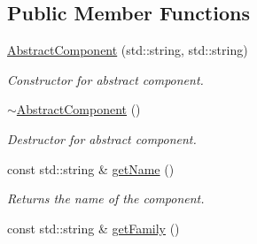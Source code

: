 \subsection*{Public Member Functions}
\begin{DoxyCompactItemize}
\item 
\hypertarget{class_abstract_component_ab08b845eddbdbe411b95a5385501ab97}{\hyperlink{class_abstract_component_ab08b845eddbdbe411b95a5385501ab97}{Abstract\-Component} (std\-::string, std\-::string)}\label{d1/dae/class_abstract_component_ab08b845eddbdbe411b95a5385501ab97}

\begin{DoxyCompactList}\small\item\em Constructor for abstract component. \end{DoxyCompactList}\item 
\hypertarget{class_abstract_component_afaec63065d4d9c9d4c51ae558f5aa822}{\hyperlink{class_abstract_component_afaec63065d4d9c9d4c51ae558f5aa822}{$\sim$\-Abstract\-Component} ()}\label{d1/dae/class_abstract_component_afaec63065d4d9c9d4c51ae558f5aa822}

\begin{DoxyCompactList}\small\item\em Destructor for abstract component. \end{DoxyCompactList}\item 
const std\-::string \& \hyperlink{class_abstract_component_af4bae0249d512eee5085557039e2c6a4}{get\-Name} ()
\begin{DoxyCompactList}\small\item\em Returns the name of the component. \end{DoxyCompactList}\item 
\hypertarget{class_abstract_component_a87edb785966a8ff735241192ce7c4267}{const std\-::string \& \hyperlink{class_abstract_component_a87edb785966a8ff735241192ce7c4267}{get\-Family} ()}\label{d1/dae/class_abstract_component_a87edb785966a8ff735241192ce7c4267}


\end{DoxyCompactItemize}
